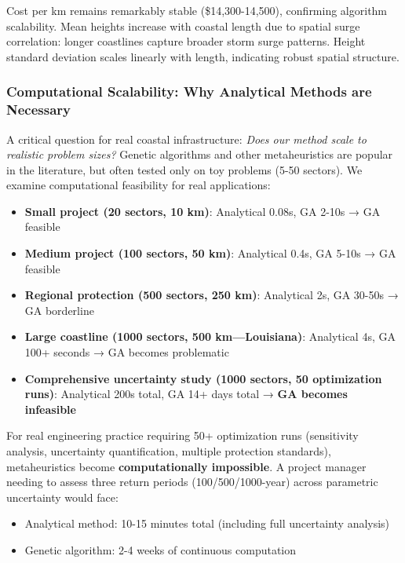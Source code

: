 \documentclass[review]{elsarticle}
\begin{document}
Cost per km remains remarkably stable (\$14,300-14,500), confirming algorithm scalability. Mean heights increase with coastal length due to spatial surge correlation: longer coastlines capture broader storm surge patterns. Height standard deviation scales linearly with length, indicating robust spatial structure.

\subsubsection{Computational Scalability: Why Analytical Methods are Necessary}

A critical question for real coastal infrastructure: \textit{Does our method scale to realistic problem sizes?} Genetic algorithms and other metaheuristics are popular in the literature, but often tested only on toy problems (5-50 sectors). We examine computational feasibility for real applications:

\begin{itemize}
\item \textbf{Small project (20 sectors, 10 km)}: Analytical 0.08s, GA 2-10s → GA feasible
\item \textbf{Medium project (100 sectors, 50 km)}: Analytical 0.4s, GA 5-10s → GA feasible
\item \textbf{Regional protection (500 sectors, 250 km)}: Analytical 2s, GA 30-50s → GA borderline
\item \textbf{Large coastline (1000 sectors, 500 km—Louisiana)}: Analytical 4s, GA 100+ seconds → GA becomes problematic
\item \textbf{Comprehensive uncertainty study (1000 sectors, 50 optimization runs)}: Analytical 200s total, GA 14+ days total → \textbf{GA becomes infeasible}
\end{itemize}

For real engineering practice requiring 50+ optimization runs (sensitivity analysis, uncertainty quantification, multiple protection standards), metaheuristics become \textbf{computationally impossible}. A project manager needing to assess three return periods (100/500/1000-year) across parametric uncertainty would face:

\begin{itemize}
\item Analytical method: 10-15 minutes total (including full uncertainty analysis)
\item Genetic algorithm: 2-4 weeks of continuous computation
\end{itemize}
\end{document}
